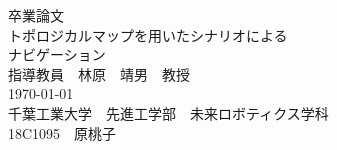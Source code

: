 \documentclass[../main]{subfiles}
\begin{document}
  \begin{titlepage}
    \begin{center}
      \vspace*{3cm}
      {\huge  卒業論文}\\
      \vspace{2cm}
      {\huge トポロジカルマップを用いたシナリオによる\\ナビゲーション}\\
      \vspace{4cm}
      \vspace{1cm}
      {\LARGE 指導教員　林原　靖男　教授}\\
      \vspace{2cm}
      {\LARGE \today}\\
      \vspace{1cm}
      {\LARGE 千葉工業大学　先進工学部　未来ロボティクス学科}\\
      \vspace{1cm}
      {\LARGE 18C1095　原桃子}\\
    \end{center}
  \end{titlepage}
\end{document}
